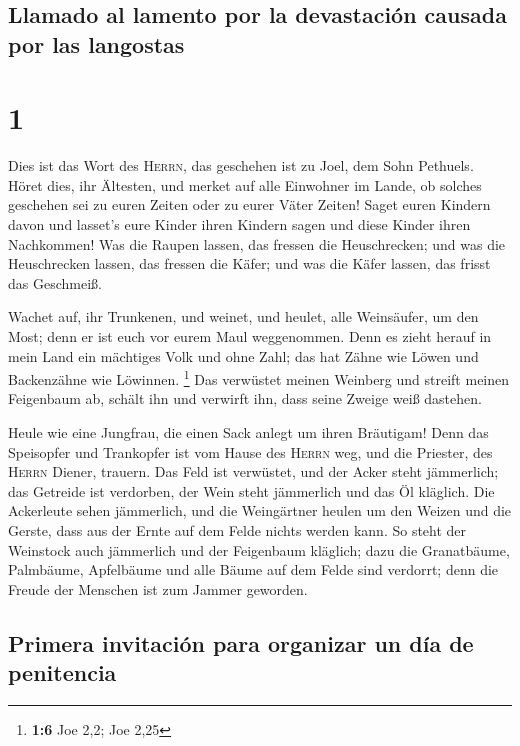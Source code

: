 \hypertarget{llamado-al-lamento-por-la-devastaciuxf3n-causada-por-las-langostas}{%
\subsection{Llamado al lamento por la devastación causada por las
langostas}\label{llamado-al-lamento-por-la-devastaciuxf3n-causada-por-las-langostas}}

\hypertarget{section}{%
\section{1}\label{section}}

 Dies ist das Wort des \textsc{Herrn}, das geschehen ist
zu Joel, dem Sohn Pethuels.  Höret dies, ihr Ältesten, und
merket auf alle Einwohner im Lande, ob solches geschehen sei zu euren
Zeiten oder zu eurer Väter Zeiten!  Saget euren Kindern
davon und lasset's eure Kinder ihren Kindern sagen und diese Kinder
ihren Nachkommen!  Was die Raupen lassen, das fressen die
Heuschrecken; und was die Heuschrecken lassen, das fressen die Käfer;
und was die Käfer lassen, das frisst das Geschmeiß.

 Wachet auf, ihr Trunkenen, und weinet, und heulet, alle
Weinsäufer, um den Most; denn er ist euch vor eurem Maul weggenommen.
 Denn es zieht herauf in mein Land ein mächtiges Volk und
ohne Zahl; das hat Zähne wie Löwen und Backenzähne wie Löwinnen.
\footnote{\textbf{1:6} Joe 2,2; Joe 2,25}  Das verwüstet
meinen Weinberg und streift meinen Feigenbaum ab, schält ihn und
verwirft ihn, dass seine Zweige weiß dastehen.

 Heule wie eine Jungfrau, die einen Sack anlegt um ihren
Bräutigam!  Denn das Speisopfer und Trankopfer ist vom
Hause des \textsc{Herrn} weg, und die Priester, des \textsc{Herrn}
Diener, trauern.  Das Feld ist verwüstet, und der Acker
steht jämmerlich; das Getreide ist verdorben, der Wein steht jämmerlich
und das Öl kläglich.  Die Ackerleute sehen jämmerlich,
und die Weingärtner heulen um den Weizen und die Gerste, dass aus der
Ernte auf dem Felde nichts werden kann.  So steht der
Weinstock auch jämmerlich und der Feigenbaum kläglich; dazu die
Granatbäume, Palmbäume, Apfelbäume und alle Bäume auf dem Felde sind
verdorrt; denn die Freude der Menschen ist zum Jammer geworden.

\hypertarget{primera-invitaciuxf3n-para-organizar-un-duxeda-de-penitencia}{%
\subsection{Primera invitación para organizar un día de
penitencia}\label{primera-invitaciuxf3n-para-organizar-un-duxeda-de-penitencia}}

